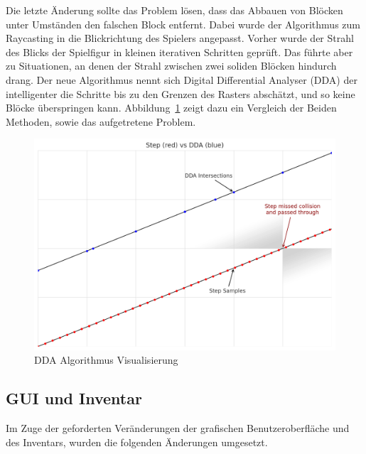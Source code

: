 \documentclass{article}
\begin{document}
Die letzte Änderung sollte das Problem lösen, dass das Abbauen von Blöcken unter Umständen den falschen Block entfernt. Dabei wurde der Algorithmus zum Raycasting in die Blickrichtung des Spielers angepasst. Vorher wurde der Strahl des Blicks der Spielfigur in kleinen iterativen Schritten geprüft. Das führte aber zu Situationen, an denen der Strahl zwischen zwei soliden Blöcken hindurch drang. Der neue Algorithmus nennt sich Digital Differential Analyser (DDA) der intelligenter die Schritte bis zu den Grenzen des Rasters abschätzt, und so keine Blöcke überspringen kann. Abbildung~\ref{pic:dda} zeigt dazu ein Vergleich der Beiden Methoden, sowie das aufgetretene Problem.

\begin{figure} [ht]
  \centering
  \includegraphics[width=1\linewidth]{dda.png}
  \caption{DDA Algorithmus Visualisierung}
  \label{pic:dda}
\end{figure}

\FloatBarrier

\subsection{GUI und Inventar}

Im Zuge der geforderten Veränderungen der grafischen Benutzeroberfläche und des Inventars, wurden die folgenden Änderungen umgesetzt.
\end{document}
